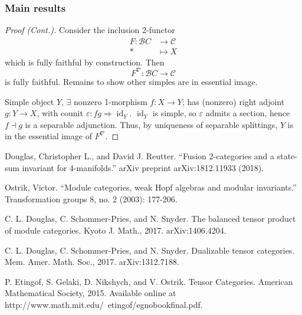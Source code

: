 \documentclass{beamer}
\newcommand{\veps}{{\varepsilon}}
\DeclareMathOperator{\id}{id}
\newcommand{\cB}{{\mathcal{B}}}
\newcommand{\cC}{{\mathcal{C}}}
\begin{document}
\begin{frame}
\frametitle{Main results}

\begin{proof}[Proof (Cont.)]

Consider the inclusion 2-functor
\begin{align*}
F : \cB C &\to \cC
\\
* &\mapsto X
\end{align*}
which is fully faithful by construction.
\pause
Then
\[
F^\nabla: \cB C \to \cC
\]
is fully faithful.
\pause
Remains to show other simples are in essential image.

\pause
Simple object $Y$,
\pause
$\exists$ nonzero 1-morphism $f: X \to Y$;
\pause
has (nonzero) right adjoint $g: Y \to X$,
with counit $\veps : fg \Rightarrow \id_Y$.
\pause
$\id_Y$ is simple, so $\veps$ admits a section,
\pause
hence $f \dashv g$ is a separable adjunction.
\pause
Thus, by uniqueness of separable splittings,
$Y$ is in the essential image of $F^\nabla$.
\end{proof}
\end{frame}

\begin{frame}
\begin{thebibliography}{1}

 Douglas, Christopher L., and David J. Reutter. ``Fusion
2-categories and a state-sum invariant for 4-manifolds.'' arXiv preprint arXiv:1812.11933 (2018).

 Ostrik, Victor. ``Module categories, weak Hopf algebras and
modular invariants.'' Transformation groups 8, no. 2 (2003): 177-206.

 C. L. Douglas, C. Schommer-Pries, and N. Snyder. The balanced tensor product of module
categories. Kyoto J. Math., 2017. arXiv:1406.4204.

 C. L. Douglas, C. Schommer-Pries, and N. Snyder. Dualizable tensor categories. Mem. Amer.
Math. Soc., 2017. arXiv:1312.7188.

 P. Etingof, S. Gelaki, D. Nikshych, and V. Ostrik. Tensor Categories. American Mathematical
Society, 2015. Available online at http://www.math.mit.edu/~etingof/egnobookfinal.pdf.

\end{thebibliography}
\end{frame}
\end{document}
